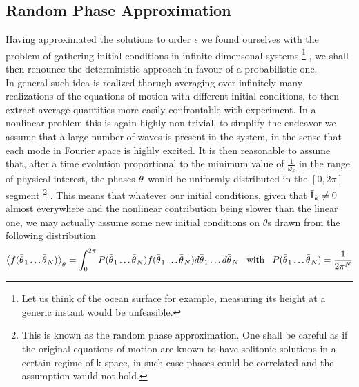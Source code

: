 \subsection{Random Phase Approximation}
Having approximated the solutions to order $\epsilon$ we found ourselves with the problem of gathering 
initial conditions in infinite dimensonal systems
\footnote{Let us think of the ocean surface for example, measuring its height at a generic instant would be unfeasible.}
, we shall then renounce the deterministic approach in favour of 
a probabilistic one.\\
In general such idea is realized thorugh averaging over infinitely many realizations of the equations of motion with different initial conditions, to then extract 
average quantities more easily confrontable with experiment. In a nonlinear problem this is again highly non trivial, to simplify the endeavor we assume that
a large number of waves is present in the system, in the sense that each mode in Fourier space is highly excited. It is then reasonable to assume that, after a time
evolution proportional to the minimum value of $\frac{1}{\omega_k}$ in the range of physical interest, the phases $\theta^{}$ would be uniformly distributed in the $\left[0,2\pi\right]$ segment 
\footnote{This is known as the random phase approximation. One shall be careful as if the original equations of motion are known to have solitonic solutions in a certain regime of k-space, 
in such case phases could be correlated and the assumption would not hold.}
. This means that whatever our initial conditions, given that $\bar{\mathrm{I}^{}}_k \neq 0$ almost everywhere and the nonlinear contribution being slower than the linear one,
we may actually assume some new initial conditions on $\theta$s drawn from the following distribution
\begin{equation}
    \left\langle f(\bar{\theta^{}}_1 \dots \bar{\theta^{}}_N) \right\rangle_{\bar{\theta}^{}} = 
    \int_{0}^{2\pi} P(\bar{\theta^{}}_1 \dots \bar{\theta^{}}_N)f(\bar{\theta^{}}_1 \dots \bar{\theta^{}}_N) d\bar{\theta^{}}_1 \dots d\bar{\theta^{}}_N 
    \hspace{3mm} \text{with} \hspace{3mm}
    P(\bar{\theta^{}}_1 \dots \bar{\theta^{}}_N) = \frac{1}{2\pi^{N}}
\end{equation}

